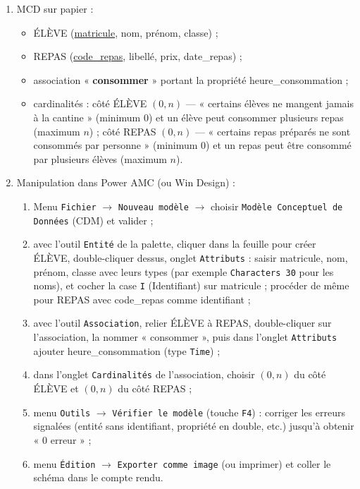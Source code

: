\documentclass[11pt]{article}
\begin{document}
\begin{corrige}
\begin{enumerate}
\item MCD sur papier :
\begin{itemize}
\item ÉLÈVE (\underline{matricule}, nom, prénom, classe) ;
\item REPAS (\underline{code\_repas}, libellé, prix, date\_repas) ;
\item association « \textbf{consommer} » portant la propriété heure\_consommation ;
\item cardinalités : côté ÉLÈVE $(0, n)$ — « certains élèves ne mangent jamais à la cantine » (minimum $0$) et un élève peut consommer plusieurs repas (maximum $n$) ; côté REPAS $(0, n)$ — « certains repas préparés ne sont consommés par personne » (minimum $0$) et un repas peut être consommé par plusieurs élèves (maximum $n$).
\end{itemize}
\item Manipulation dans Power AMC (ou Win Design) :
\begin{enumerate}
\item Menu \texttt{Fichier} $\rightarrow$ \texttt{Nouveau modèle} $\rightarrow$ choisir \texttt{Modèle Conceptuel de Données} (CDM) et valider ;
\item avec l'outil \texttt{Entité} de la palette, cliquer dans la feuille pour créer ÉLÈVE, double-cliquer dessus, onglet \texttt{Attributs} : saisir matricule, nom, prénom, classe avec leurs types (par exemple \texttt{Characters 30} pour les noms), et cocher la case \texttt{I} (Identifiant) sur matricule ; procéder de même pour REPAS avec code\_repas comme identifiant ;
\item avec l'outil \texttt{Association}, relier ÉLÈVE à REPAS, double-cliquer sur l'association, la nommer « consommer », puis dans l'onglet \texttt{Attributs} ajouter heure\_consommation (type \texttt{Time}) ;
\item dans l'onglet \texttt{Cardinalités} de l'association, choisir $(0, n)$ du côté ÉLÈVE et $(0, n)$ du côté REPAS ;
\item menu \texttt{Outils} $\rightarrow$ \texttt{Vérifier le modèle} (touche \texttt{F4}) : corriger les erreurs signalées (entité sans identifiant, propriété en double, etc.) jusqu'à obtenir « 0 erreur » ;
\item menu \texttt{Édition} $\rightarrow$ \texttt{Exporter comme image} (ou imprimer) et coller le schéma dans le compte rendu.

\end{enumerate}
\end{enumerate}
\end{corrige}
\end{document}
